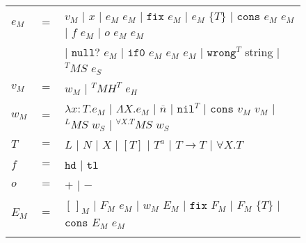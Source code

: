 \begin{figure}[p]
\centering
\begin{tabular}{lcl}
\vspace{5pt}

$e_{M}$ & $=$ & $v_{M}$ $\vert$ $x$ $\vert$ $e_{M}$ $e_{M}$ $\vert$ $\mathtt{fix}$ $e_{M}$ $\vert$ $e_{M}$ $\lbrace T\rbrace$ $\vert$ $\mathtt{cons}$ $e_{M}$ $e_{M}$ $\vert$ $f$ $e_{M}$ $\vert$ $o$ $e_{M}$ $e_{M}$ \\

\vspace{5pt}

&& $\vert$ $\mathtt{null?}$ $e_{M}$ $\vert$ $\mathtt{if0}$ $e_{M}$ $e_{M}$ $e_{M}$ $\vert$ $\mathtt{wrong}^{T}$ string $\vert$ $^{T}MS$ $e_{S}$ \\

\vspace{5pt}

$v_{M}$ & $=$ & $w_{M}$ $\vert$ $^{T}MH^{T}$ $e_{H}$ \\

\vspace{5pt}

$w_{M}$ & $=$ & $\lambda x:T.e_{M}$ $\vert$ $\Lambda X.e_{M}$ $\vert$ $\overline{n}$ $\vert$ $\mathtt{nil}^{T}$ $\vert$ $\mathtt{cons}$ $v_{M}$ $v_{M}$ $\vert$ $^{L}MS$ $w_{S}$ $\vert$ $^{\forall X.T}MS$ $w_{S}$ \\

\vspace{5pt}

$T$ & $=$ & $L$ $\vert$ $N$ $\vert$ $X$ $\vert$ $[T]$ $\vert$ $T^{a}$ $\vert$ $T\rightarrow T$ $\vert$ $\forall X.T$ \\

\vspace{5pt}

$f$ & $=$ & $\mathtt{hd}$ $\vert$ $\mathtt{tl}$ \\

\vspace{5pt}

$o$ & $=$ & $+$ $\vert$ $-$ \\

\vspace{5pt}

$E_{M}$ & $=$ & $[\,]_{M}$ $\vert$ $F_{M}$ $e_{M}$ $\vert$ $w_{M}$ $E_{M}$ $\vert$ $\mathtt{fix}$ $F_{M}$ $\vert$ $F_{M}$ $\lbrace T\rbrace$ $\vert$ $\mathtt{cons}$ $E_{M}$ $e_{M}$ \\

\vspace{5pt}


\end{tabular}
\end{figure}
